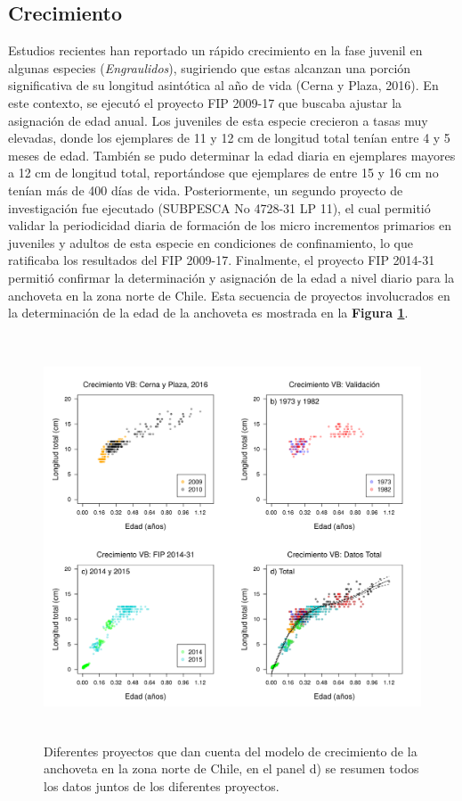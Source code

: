 \documentclass[letter,11pt]{article}
\begin{document}
\newpage


\subsection{Crecimiento}

Estudios recientes han reportado un r\'apido crecimiento en la fase juvenil
en algunas especies (\textit{Engraulidos}), sugiriendo que estas alcanzan
una porci\'on significativa de su longitud asint\'otica al a\~{n}o de vida (Cerna y
Plaza, 2016). En este contexto, se ejecut\'o el proyecto FIP 2009-17 que
buscaba ajustar la asignaci\'on de edad anual. Los juveniles de esta especie crecieron
a tasas muy elevadas, donde los ejemplares de 11 y 12 cm de longitud total
ten\'ian entre 4 y 5 meses de edad. Tambi\'en se pudo determinar la edad
diaria en ejemplares mayores a 12 cm de longitud total, report\'andose que
ejemplares de entre 15 y 16 cm no ten\'ian m\'as de 400 d\'ias de vida.
Posteriormente, un segundo proyecto de investigaci\'on fue ejecutado
(SUBPESCA No 4728-31 LP 11), el cual permiti\'o validar la periodicidad
diaria de formaci\'on de los micro incrementos primarios en juveniles y
adultos de esta especie en condiciones de confinamiento, lo que
ratificaba los resultados del FIP 2009-17. Finalmente, el proyecto FIP 2014-31
permiti\'o confirmar la determinaci\'on y asignaci\'on de la edad a nivel diario 
para la anchoveta en la zona norte de Chile.
Esta secuencia de proyectos involucrados en la determinaci\'on de la edad
de la anchoveta es mostrada en la \textbf{Figura \ref{Fig03}}.\\


\vspace{0.5cm}
\begin{figure}[htb!]
 \centering
 \includegraphics[width=16cm,height=12cm]{fig/figura03.pdf}
 \caption{Diferentes proyectos que dan cuenta del modelo de crecimiento de la anchoveta en la zona norte de Chile, en el panel d) se resumen todos los datos juntos de los diferentes proyectos.}
 \label{Fig03}
\end{figure}
\vspace{0.5cm}
\end{document}
